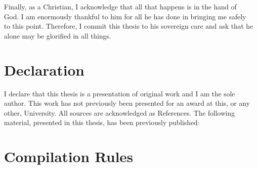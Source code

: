 \documentclass[a4paper,11pt,twoside,openright]{report}
\newif\ifFullModel
\newcommand{\IfFullModel}[1]{\ifFullModel #1 \fi}
\newcommand{\IfNotFullModel}[1]{\ifFullModel \else #1 \fi}
\begin{document}
Finally, as a Christian, I acknowledge that all that happens is in the
hand of God. 
I am enormously thankful to him for all he has done in bringing me
safely to this point. 
Therefore, I commit this thesis to his sovereign care and ask that he
alone may be glorified in all things.


\cleardoublepage
{}
{}
\chapter*{Declaration}

I declare that this thesis is a presentation of original work and I am
the sole author. 
This work has not previously been presented for an award at this, or
any other, University. 
All sources are acknowledged as References.
The following material, presented in this thesis, has been previously
published:

\begin{refsegment}
  \raggedright
  \nocite{baxter2015a,baxter2017,freitas2016}
  \setlength{\bibitemsep}{0.5cm}
  \printbibliography[resetnumbers=true,segment=\therefsegment,heading=none]
\end{refsegment}
















\appendix

\FullModeltrue
\chapter{Compilation Rules}
\label{compilation-rules-appendix}



{\raggedright \printbibliography}
\end{document}
